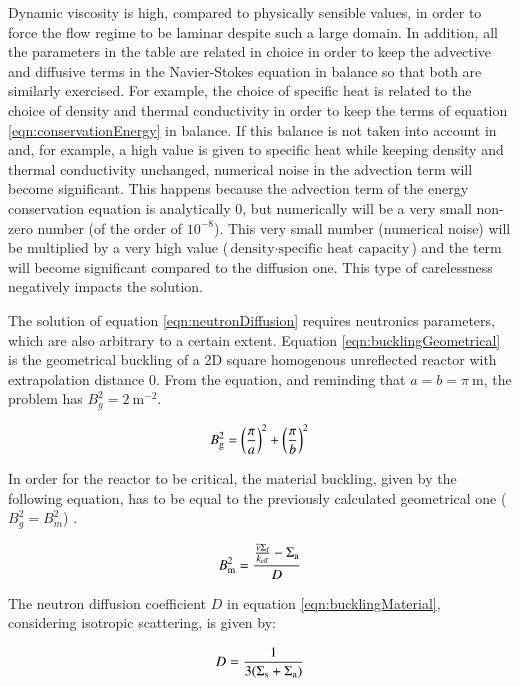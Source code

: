 Dynamic viscosity is high, compared to physically sensible values, in order to force the flow regime to be laminar despite such a large domain.
In addition, all the parameters in the table are related in choice in order to keep the advective and diffusive terms in the Navier-Stokes equation in balance so that both are similarly exercised.
For example, the choice of specific heat is related to the choice of density and thermal conductivity in order to keep the terms of equation \ref{eqn:conservationEnergy} in balance.
If this balance is not taken into account in and, for example, a high value is given to specific heat while keeping density and thermal conductivity unchanged, numerical noise in the advection term will become significant.
This happens because the advection term of the energy conservation equation is analytically 0, but numerically will be a very small non-zero number (of the order of $ 10^{-8} $).
This very small number (numerical noise) will be multiplied by a very high value ($ \text{density} \cdot \text{specific heat capacity} $) and the term will become significant compared to the diffusion one.
This type of carelessness negatively impacts the solution.

The solution of equation \ref{eqn:neutronDiffusion} requires neutronics parameters, which are also arbitrary to a certain extent.
Equation \ref{eqn:bucklingGeometrical} is the geometrical buckling of a 2D square homogenous unreflected reactor with extrapolation distance 0.
From the equation, and reminding that $ a = b = \pi \ \text {m} $, the problem has $ B_{g}^2 = 2 \ \text{m}^{-2} $.

\begin{equation}
    \bucklingGeometrical
\end{equation}

In order for the reactor to be critical, the material buckling, given by the following equation, has to be equal to the previously calculated geometrical one ($ B_{g}^2 = B_{m}^2 $) \cite{stacey_nuclear_2007}.

\begin{equation}
    \bucklingMaterial
\end{equation}

The neutron diffusion coefficient $ D $ in equation \ref{eqn:bucklingMaterial}, considering isotropic scattering, is given by:

\begin{equation}
    \diffusionCoefficient
\end{equation}


